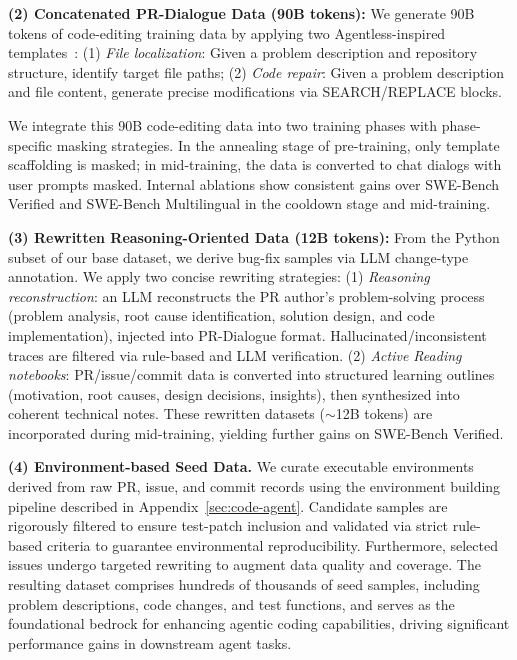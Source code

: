 \noindent \textbf{(2) Concatenated PR-Dialogue Data (90B tokens):}
We generate 90B tokens of code-editing training data by applying two Agentless-inspired templates~\cite{xia2024agentless}:
(1) \textit{File localization}: Given a problem description and repository structure, identify target file paths;
(2) \textit{Code repair}: Given a problem description and file content, generate precise modifications via SEARCH/REPLACE blocks.

\noindent We integrate this 90B code-editing data into two training phases with phase-specific masking strategies.
In the annealing stage of pre-training, only template scaffolding is masked; in mid-training, the data is converted to chat dialogs with user prompts masked.
Internal ablations show consistent gains over SWE-Bench Verified and SWE-Bench Multilingual in the cooldown stage and mid-training.

\noindent \textbf{(3) Rewritten Reasoning-Oriented Data (12B tokens):}
From the Python subset of our base dataset, we derive bug-fix samples via LLM change-type annotation.
We apply two concise rewriting strategies:
(1) \textit{Reasoning reconstruction}: an LLM reconstructs the PR author’s problem-solving process (problem analysis, root cause identification, solution design, and code implementation), injected into PR-Dialogue format.
Hallucinated/inconsistent traces are filtered via rule-based and LLM verification.
(2) \textit{Active Reading notebooks}: PR/issue/commit data is converted into structured learning outlines (motivation, root causes, design decisions, insights), then synthesized into coherent technical notes.
These rewritten datasets ($\sim$12B tokens) are incorporated during mid-training, yielding further gains on SWE-Bench Verified.

\noindent \textbf{(4) Environment-based Seed Data.}
We curate executable environments derived from raw PR, issue, and commit records using the environment building pipeline described in Appendix~\ref{sec:code-agent}.
Candidate samples are rigorously filtered to ensure test-patch inclusion and validated via strict rule-based criteria to guarantee environmental reproducibility.
Furthermore, selected issues undergo targeted rewriting to augment data quality and coverage.
The resulting dataset comprises hundreds of thousands of seed samples, including problem descriptions, code changes, and test functions, and serves as the foundational bedrock for enhancing agentic coding capabilities, driving significant performance gains in downstream agent tasks.


